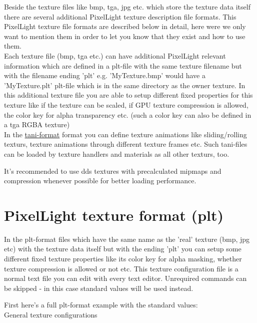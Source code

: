 Beside the texture files like bmp, tga, jpg etc. which store the texture data itself there are
several additional PixelLight texture description file formats. This PixelLight texture file formats are described below in
detail, here were we only want to mention them in order to let you know that they exist and how to
use them.\\
Each texture file (bmp, tga etc.) can have additional PixelLight relevant information which are defined
in a plt-file with the same texture filename but with the filename ending 'plt' e.g. 'MyTexture.bmp'
would have a 'MyTexture.plt' plt-file which is in the same directory as the owner texture. In this
additional texture file you are able to setup different fixed properties for this texture like if
the texture can be scaled, if GPU texture compression is allowed, the color key for alpha transparency
etc. (such a color key can also be defined in a tga RGBA texture)\\
In the \hyperlink{tani}{tani-format} format you can define texture animations like sliding/rolling
texturs, texture animations through different texture frames etc. Such tani-files can be loaded by
texture handlers and materials as all other texturs, too.

It's recommended to use dds textures with precalculated mipmaps and compression whenever possible
for better loading performance.




\section{PixelLight texture format (plt)}
In the plt-format files which have the same name as the 'real' texture (bmp, jpg etc) with the texture
data itself but with the ending 'plt' you can setup some different fixed texture properties like its
color key for alpha masking, whether texture compression is allowed or not etc. This texture
configuration file is a normal text file you can edit with every text editor. Unrequired commands
can be skipped - in this case standard values will be used instead.

First here's a full plt-format example with the standard values:\\



General texture configurations\\

